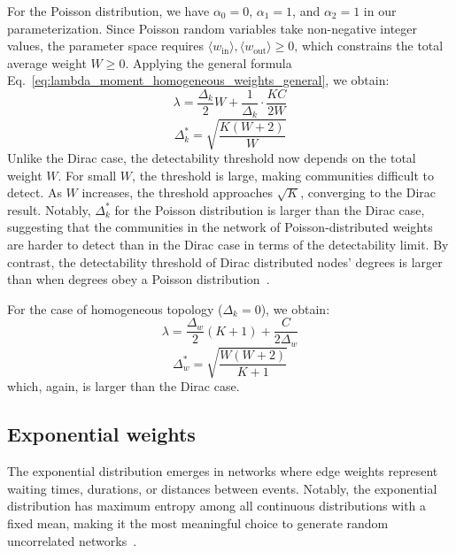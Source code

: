 \documentclass[a4paper,pre,superscriptaddress,floatfix,nofootinbib,twocolumn]{revtex4-1}
\begin{document}
For the Poisson distribution,
we have
$\alpha_0 = 0$,
$\alpha_1 = 1$, and $\alpha_2 = 1$ in our parameterization. Since Poisson random variables take non-negative integer values, the parameter space requires
$\langle w_{\text{in}} \rangle, \langle w_{\text{out}} \rangle \geq 0$,
which constrains the total average weight $W \geq 0$. Applying the general formula Eq.~\eqref{eq:lambda_moment_homogeneous_weights_general}, we obtain:
\begin{equation}
\lambda = \frac{\Delta_{k}}{2}W + \frac{1}{\Delta_{k}} \cdot \frac{KC}{2W}
\label{eq:lambda_poisson}
\end{equation}
\begin{equation}
    \Delta_k^* = \sqrt{\frac{K \left( W +2\right)}{W}}
\label{eq:poisson_det}
\end{equation}
Unlike the Dirac case, the detectability threshold now depends on the total weight $W$. For small $W$, the threshold is large, making communities difficult to detect. As $W$ increases, the threshold approaches $\sqrt{K}$, converging to the Dirac result.
Notably, $\Delta_k^*$ for the Poisson distribution is larger than the Dirac case,
suggesting that the communities in the network of Poisson-distributed weights are harder to detect than in the Dirac case in terms of the detectability limit.
By contrast, the detectability threshold of Dirac distributed nodes' degrees is larger than when degrees obey a Poisson distribution~\cite{radicchi2013detectability}.

For the case of homogeneous topology ($\Delta_{k} = 0$), we obtain:
\begin{equation}
\lambda = \frac{\Delta_{w}}{2} \left(K + 1 \right) + \frac{C}{2 \Delta_{w}}
\label{eq:lambda_poisson_w}
\end{equation}
\begin{equation}
    \Delta_{w}^* = \sqrt{\frac{W (W +2)}{K + 1}}
\label{eq:poisson_w_det}
\end{equation}
which, again, is larger than the Dirac case.

\subsection*{Exponential weights}

The exponential distribution emerges in networks where edge weights represent waiting times, durations, or distances between events. Notably, the exponential distribution has maximum entropy among all continuous distributions with a fixed mean, making it the
most meaningful choice to generate random uncorrelated networks~\cite{bianconi2007entropy,bianconi2009entropy, vallarano2021fast,garlaschelli2009generalized}.
\end{document}
